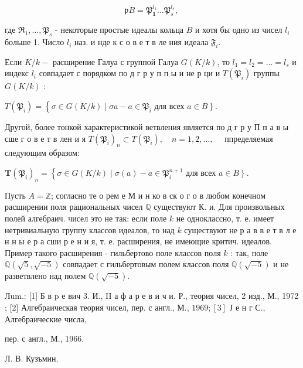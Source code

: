 \documentclass[10pt]{article}
\begin{document}
\[

\mathfrak{p} B=\mathfrak{P}_{\mathbf{1}}^{l_{1}} \ldots \mathfrak{P}_{s}^{l_{s}} \text {, }

\]



где $\Re_{1}, \ldots, \mathfrak{P}_{s}$ - некоторые простые идеалы кольца $B$ и хотя бы одно из чисел $l_{i}$ больше 1. Число $l_{i}$ наз. и нде к с о в е т в ле ния идеала $\mathfrak{F}_{i}$.



Если $K / k-$ расширение Галуа с группой Галуа $G(K / k)$, то $l_{1}=l_{2}=\ldots=l_{s}$ и индекс $l_{i}$ совпадает с порядком по д г р у п п ы и не р ци и $T\left(\mathfrak{P}_{i}\right)$ группы $G(K / k)$ :



$T\left(\mathfrak{P}_{i}\right)=\left\{\sigma \in G(K / k) \mid \sigma a-a \in \mathfrak{P}_{i}\right.$ для всех $\left.a \in B\right\}$.



Другой, более тонкой характеристикой ветвления является по д г р у П п а в ы сше г о в е т в лен и я $T\left(\mathfrak{P}_{i}\right)_{n} \subset T\left(\mathfrak{P}_{i}\right), \quad n=1,2, \ldots, \quad$ ппределяемая следующим образом:



$\boldsymbol{T}\left(\mathfrak{P}_{i}\right)_{n}=\left\{\sigma \in G(K / k) \mid \sigma(a)-a \in \mathfrak{P}_{i}^{n+1}\right.$ для всех $\left.a \in B\right\}$.



Пусть $A=\mathbb{Z}$; согласно те о рем е М и н ко в ск о г о в любом конечном расширении поля рациональных чисел $\mathbb{Q}$ существуют К. и. Для произвольных полей алгебраич. чисел это не так: если поле $k$ не одноклассно, т. е. имеет нетривиальную группу классов идеалов, то над $k$ существуют не р а в в е т в л е н н ы е р а сши р е н и я, т. е. расширения, не имеющие критич. идеалов. Пример такого расширения - гильбертово поле классов поля $k$ : так, поле $\mathbb{Q}(\sqrt{5}, \sqrt{-5})$ совпадает с гильбертовым полем классов поля $\mathbb{Q}(\sqrt{-5})$ и не разветвлено над полем $\mathbb{Q}(\sqrt{-5})$.



Лum.: [1] Б в p е вич 3. И., II а ф а р е в и ч и. Р., теория чисел, 2 изд., М., 1972 ; [2] Алгебраическая теория чисел, пер. с англ., М., $1969 ;[3]$ Ј е н г С., Алгебраические числа,

пер. с англ., М., 1966.

Л. В. Кузъмин.
\end{document}
